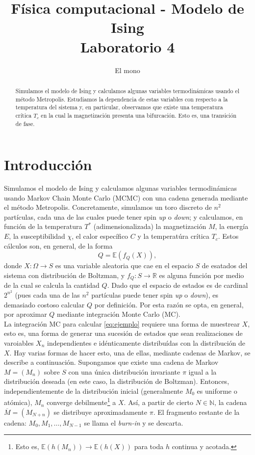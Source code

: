 \documentclass[a4paper,12pt]{article}
\title{Física computacional - Modelo de Ising \\ Laboratorio 4}
\author{El mono}
\date{}
\newcommand{\R}{\mathbb{R}}
\newcommand{\N}{\mathbb{N}}
\newcommand{\E}{\mathbb{E}}
\begin{document}
\maketitle

\begin{abstract}
    Simulamos el modelo de Ising y calculamos algunas variables termodinámicas usando el método Metropolis. Estudiamos la dependencia de estas variables con respecto a la temperatura del sistema y, en particular, observamos que existe una temperatura crítica $T_c$ en la cual la magnetización presenta una bifurcación. Esto es, una transición de fase.
\end{abstract}

\section{Introducción}

Simulamos el modelo de Ising y calculamos algunas variables termodinámicas usando Markov Chain Monte Carlo (MCMC) con una cadena generada mediante el método Metropolis. Concretamente, simulamos un toro discreto de $n^2$ partículas, cada una de las cuales puede tener spin {\it up} o {\it down}; y calculamos, en función de la temperatura $T^*$ (adimensionalizada) la magnetización $M$, la energía $E$, la susceptibilidad $\chi$, el calor específico $C$ y la temperatúra crítica $T_c$. Estos cálculos son, en general, de la forma
\begin{equation}
    \label{eq:ejemplo}
    Q = \E(f_Q(X)),
\end{equation}
donde $X : \Omega \to S$ es una variable aleatoria que cae en el espacio $S$ de esatados del sistema con distribución de Boltzman, y $f_Q : S \to \R$ es alguna función por medio de la cual se calcula la cantidad $Q$. Dado que el espacio de estados es de cardinal $2^{n^2}$ (pues cada una de las $n^2$ partículas puede tener spin {\it up} o {\it down}), es demasiado costoso calcular $Q$ por definición. Por esta razón se opta, en general, por aproximar $Q$ mediante integración Monte Carlo (MC).\\

La integración MC para calcular \eqref{eq:ejemplo} requiere una forma de muestrear $X$, esto es, una forma de generar una sucesión de estados que sean realizaciones de varoiables $X_n$ independientes e idénticamente distribuídas con la distribución de $X$. Hay varias formas de hacer esto, una de ellas, mediante cadenas de Markov, se describe a continuación. Supongamos que existe una cadena de Markov $M = (M_n)$ sobre $S$ con una única distribución invariante $\pi$ igual a la distribución deseada (en este caso, la distribución de Boltzman). Entonces, independientemente de la distribución inicial (generalmente $M_0$ es uniforme o atómica), $M_n$ converge debilmente\footnote{Esto es, $\E(h(M_n)) \to \E(h(X))$ para toda $h$ continua y acotada.} a $X$. Así, a partir de cierto $N \in \N$, la cadena $\overline{M} = (M_{N + n})$ se distribuye aproximadamente $\pi$. El fragmento restante de la cadena: $M_0, M_1, \dots, M_{N - 1}$ se llama el {\it burn-in} y se descarta.
\end{document}
